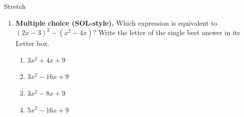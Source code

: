 \documentclass[12pt]{article}
\begin{document}
\begin{notesbox}{Stretch}
\begin{enumerate}[leftmargin=1.9em, itemsep=10pt]
  \item \textbf{Multiple choice (SOL-style).} Which expression is equivalent to
    $(2x-3)^2-(x^2-4x)$? Write the letter of the single best answer in its Letter box.
    \begin{enumerate}[label=(\Alph*), leftmargin=2.0em, itemsep=1pt]
      \item $3x^2+4x+9$
      \item $3x^2-16x+9$
      \item $3x^2-8x+9$
      \item $5x^2-16x+9$
    \end{enumerate}
\end{enumerate}
\end{notesbox}
\end{document}
